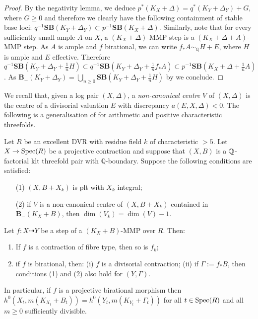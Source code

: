 \begin{proof}
	By the negativity lemma, we deduce $p^*(K_X+\Delta)=q^*(K_Y+\Delta_Y)+G,$ where $G \geq 0$ and therefore we clearly have the following containment of stable base loci: $q^{-1}\mathbf{SB}(K_Y+\Delta_Y) \subset p^{-1}\mathbf{SB}(K_X+\Delta).$
	Similarly, note that for every sufficiently small ample $A$ on $X$,
	a $(K_X+\Delta)$-MMP step is a $(K_X+\Delta+A)$-MMP step. As $A$ is ample and $f$ birational, we can write $f_*A \sim_{\mathbb{Q}} H+E$, where $H$ is ample and $E$ effective. 
	Therefore  $q^{-1}\mathbf{SB}(K_Y+\Delta_Y+\frac{1}{n}H) \subset q^{-1}\mathbf{SB}(K_Y+\Delta_Y+ \frac{1}{n}f_*A)\subset  p^{-1}\mathbf{SB}(K_X+\Delta+ \frac{1}{n}A) $.
	As $\mathbf{B}_{-}(K_Y+\Delta_Y)=\bigcup_{n \geq 0} \mathbf{SB}(K_Y+\Delta_Y+\frac{1}{n}H)$ by \cite[Proposition 1.19]{asympt-baseloci} we conclude.
\end{proof}

We recall that, given a log pair $(X,\Delta)$, a \emph{non-canonical centre} $V$ of $(X,\Delta)$ is the centre of a divisorial valuation $E$ with discrepancy $a(E, X, \Delta)<0$.  The following is a generalisation of \cite[Lemma 3.1]{HMX18} for arithmetic and positive characteristic threefolds. 

\begin{proposition}\label{lemma:MMP_in_fam2}
	Let $R$ be an excellent DVR with residue field $k$ of characteristic $>5$. Let $X \to \operatorname{Spec}(R)$ be a projective contraction and suppose that $(X,B)$ is a $\mathbb{Q}$-factorial klt threefold pair with $\mathbb{Q}$-boundary.
	Suppose the following conditions are satisfied:
	\begin{itemize}
		\item[(1)] $(X,B+X_k)$ is plt with $X_k$ integral;
		\item[(2)] if $V$ is a non-canonical centre of $(X,B+X_k)$ contained in ${\mathbf{B}_{-}(K_{X}+B)}$, then $\dim (V_{k})=\dim (V) -1$.
	\end{itemize}
	Let $f \colon X\dashrightarrow Y$ be a step of a $(K_X+B)$-MMP over $R$. Then:
	\begin{enumerate}
		\item  If $f$ is a contraction of fibre type, then so is $f_k$;
		\item if $f$ is birational, then:
		\subitem(i) $f$ is a divisorial contraction;
		\subitem(ii) if $\Gamma:=f_\ast B$, then conditions (1) and (2) also hold for $(Y,\Gamma)$.
	\end{enumerate} 
	In particular, if $f$ is a projective birational morphism then $h^0(X_t,m(K_{X_t}+B_t))=h^0(Y_t,m(K_{Y_t}+\Gamma_t))$ for all $t\in\operatorname{Spec} (R)$ and all $m\geq 0$ sufficiently divisible.
\end{proposition}

